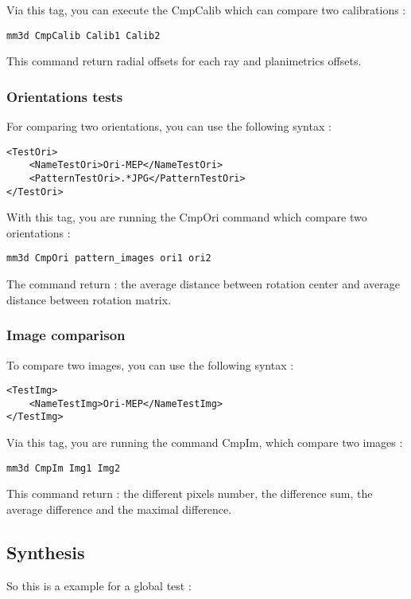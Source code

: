 \documentclass[a4paper]{book}
\begin{document}
Via this tag, you can execute the CmpCalib which can compare two calibrations :
\begin{verbatim}
mm3d CmpCalib Calib1 Calib2
\end{verbatim}

This command return radial offsets for each ray and planimetrics offsets.

\subsubsection{Orientations tests}
For comparing two orientations, you can use the following syntax :

\begin{lstlisting}
<TestOri> 
	<NameTestOri>Ori-MEP</NameTestOri>
	<PatternTestOri>.*JPG</PatternTestOri>
</TestOri>
\end{lstlisting}

With this tag, you are running the CmpOri command which compare two orientations :
\begin{verbatim}
mm3d CmpOri pattern_images ori1 ori2
\end{verbatim}
The command return : the average distance between rotation center and average distance between rotation matrix.

\subsubsection{Image comparison}
To compare two images, you can use the following syntax :

\begin{lstlisting}
<TestImg> 
	<NameTestImg>Ori-MEP</NameTestImg>
</TestImg>
\end{lstlisting}

Via this tag, you are running the command CmpIm, which compare two images :
\begin{verbatim}
mm3d CmpIm Img1 Img2
\end{verbatim}
This command return : the different pixels number, the difference sum, the average difference and the maximal difference.

\subsection{Synthesis}
So this is a example for a global test :
\end{document}
